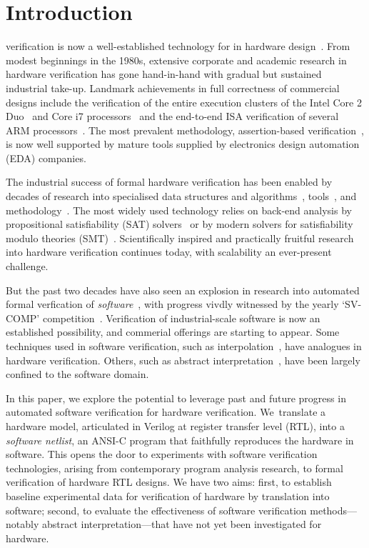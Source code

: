 \section{Introduction}\label{sec:intro}
%
 verification is now a well-established technology for in hardware design~\cite{Seligman:2015:FV}.  
From modest beginnings in the 1980s,
extensive corporate and academic research in hardware verification has gone
hand-in-hand with gradual but sustained industrial take-up.  Landmark
achievements in full correctness of commercial designs include the
verification of the entire execution clusters of the Intel Core 2
Duo~\cite{Core2} and Core i7 processors~\cite{i7} and the end-to-end ISA
verification of several ARM processors~\cite{ARM}.  The most prevalent
methodology, assertion-based verification~\cite{Foster:2009:AAB}, is now
well supported by mature tools supplied by electronics design automation (EDA) companies.

The industrial success of formal hardware verification has been enabled by
decades of research into specialised data structures and
algorithms~\cite{ic3, fmcad2000, ken, biere, STE},
tools~\cite{Seger:2005:IEE, abc, ebmc, vis, cadence, synopsysfv}, and
methodology~\cite{MCMILLAN2000279, Aagaard:2000:MLH, uclid, word-term,
word-bmc, DBLP:conf/lpar/AndrausLS08}.  The most widely used technology
relies on back-end analysis by propositional satisfiability (SAT)
solvers~\cite{Biere1999} or by modern solvers for satisfiability modulo
theories (SMT)~\cite{decision_procedures,
DBLP:conf/lpar/AndrausLS08,soc-keating,
DBLP:conf/mtv/SunkariCVM07,DBLP:conf/cav/Bjesse08}.  Scientifically inspired
and practically fruitful research into hardware verification continues
today, with scalability an ever-present challenge.

But the past two decades have also seen an explosion in research into
automated formal verfication of \emph{software}~\cite{dkw2008}, with
progress vivdly witnessed by the yearly `SV-COMP'
competition~\cite{Beyer2017}.  Verification of industrial-scale software is
now an established possibility, and commerial offerings are starting to
appear.  Some techniques used in software verification, such as
interpolation~\cite{Interpolants, Kroening:2011:ISV}, have analogues in
hardware verification.  Others, such as abstract
interpretation~\cite{CousotCousot77, Cousot:1996:AI}, have been largely
confined to the software domain.

In this paper, we explore the potential to leverage past and future progress
in automated software verification for hardware verification.  We~translate
a hardware model, articulated in Verilog at register transfer level (RTL),
into a \emph{software netlist}, an ANSI-C program that faithfully reproduces
the hardware in software.  This opens the door to experiments with software
verification technologies, arising from contemporary program analysis
research, to formal verification of hardware RTL designs.  We have two aims:
first, to establish baseline experimental data for verification of hardware
by translation into software; second, to evaluate the effectiveness of
software verification methods---notably abstract interpretation---that have
not yet been investigated for hardware.

